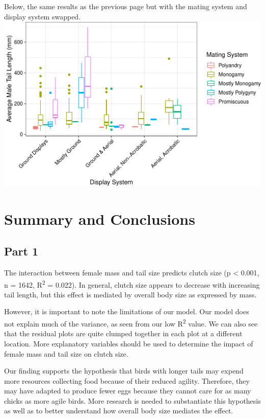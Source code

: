 \documentclass[
  12pt,
]{article}
\begin{document}
\newpage

Below, the same results as the previous page but with the mating system
and display system swapped.
\includegraphics{Project_Code_files/figure-latex/q-2-plots2-1.pdf}

\newpage

\hypertarget{summary-and-conclusions}{%
\section{Summary and Conclusions}\label{summary-and-conclusions}}

\hypertarget{part-1}{%
\subsection{Part 1}\label{part-1}}

The interaction between female mass and tail size predicts clutch size
(p \textless{} 0.001, n = 1642, R\textsuperscript{2} = 0.022). In
general, clutch size appears to decrease with increasing tail length,
but this effect is mediated by overall body size as expressed by mass.

However, it is important to note the limitations of our model. Our model
does not explain much of the variance, as seen from our low
R\textsuperscript{2} value. We can also see that the residual plots are
quite clumped together in each plot at a different location. More
explanatory variables should be used to determine the impact of female
mass and tail size on clutch size.

Our finding supports the hypothesis that birds with longer tails may
expend more resources collecting food because of their reduced agility.
Therefore, they may have adapted to produce fewer eggs because they
cannot care for as many chicks as more agile birds. More research is
needed to substantiate this hypothesis as well as to better understand
how overall body size mediates the effect.
\end{document}
